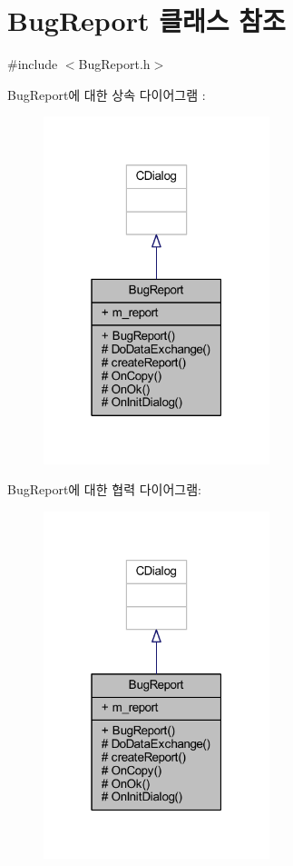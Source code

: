 \hypertarget{class_bug_report}{}\section{Bug\+Report 클래스 참조}
\label{class_bug_report}


{\ttfamily \#include $<$Bug\+Report.\+h$>$}



Bug\+Report에 대한 상속 다이어그램 \+: \nopagebreak
\begin{figure}[H]
\begin{center}
\leavevmode
\includegraphics[width=187pt]{class_bug_report__inherit__graph}
\end{center}
\end{figure}


Bug\+Report에 대한 협력 다이어그램\+:\nopagebreak
\begin{figure}[H]
\begin{center}
\leavevmode
\includegraphics[width=187pt]{class_bug_report__coll__graph}
\end{center}
\end{figure}
